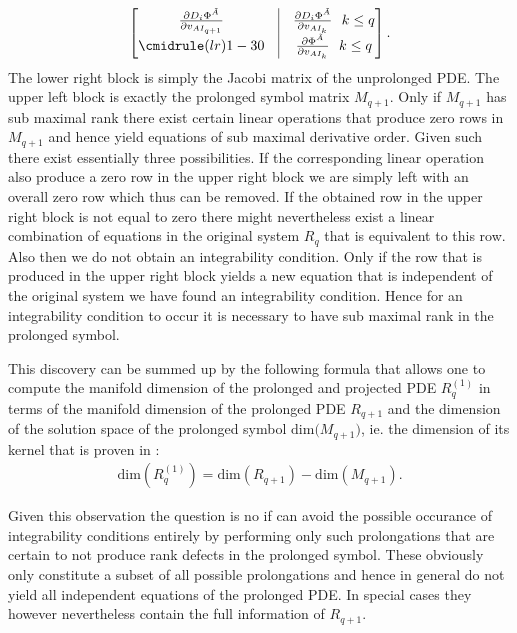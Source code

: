 \documentclass[a4paper,12pt, DIV=14, BCOR=5mm, twoside, headsepline]{scrbook}
\begin{document}
\begin{align}
\begin{bmatrix}
        \frac{\partial D_i\Phi^{\tilde{A}}}{\partial v_{AI_{q+1}}} & \vline & \frac{\partial D_i \Phi^{\tilde{A}}}{\partial v_{AI_k}} \ \ k \leq q \\
        \cmidrule(lr){1-3}
        0 & \vline & \frac{\partial \Phi^{\tilde{A}}}{\partial v_{AI_k}} \ \ k \leq q 
\end{bmatrix}.
\end{align}
The lower right block is simply the Jacobi matrix of the unprolonged PDE. The upper left block is exactly the prolonged symbol matrix $M_{q+1}$. Only if $M_{q+1}$ has sub maximal rank there exist certain linear operations that produce zero rows in $M_{q+1}$ and hence yield equations of sub maximal derivative order. Given such there exist essentially three possibilities. If the corresponding linear operation also produce a zero row in the upper right block we are simply left with an overall zero row which thus can be removed. If the obtained row in the upper right block is not equal to zero there might nevertheless exist a linear combination of equations in the original system $R_q$ that is equivalent to this row. Also then we do not obtain an integrability condition. Only if the row that is produced in the upper right block yields a new equation that is independent of the original system we have found an integrability condition.  
Hence for an integrability condition to occur it is necessary to have sub maximal rank in the prolonged symbol.

This discovery can be summed up by the following formula that allows one to compute the manifold dimension of the prolonged and projected PDE $R_q^{(1)}$ in terms of the manifold dimension of the prolonged PDE $R_{q+1}$ and the dimension of the solution space of the prolonged symbol $\mathrm{dim(}M_{q+1})$, ie. the dimension of its kernel that is proven in \cite{seiler1994analysis}:
\begin{align}
    \mathrm{dim}(R_{q}^{(1)}) = \mathrm{dim}(R_{q+1}) - \mathrm{dim}(M_{q+1}).
\end{align}

Given this observation the question is no if can avoid the possible occurance of integrability conditions entirely by performing only such prolongations that are certain to not produce rank defects in the prolonged symbol. These obviously only constitute a subset of all possible prolongations and hence in general do not yield all independent equations of the prolonged PDE. In special cases they however nevertheless contain the full information of $R_{q+1}$.
\end{document}

